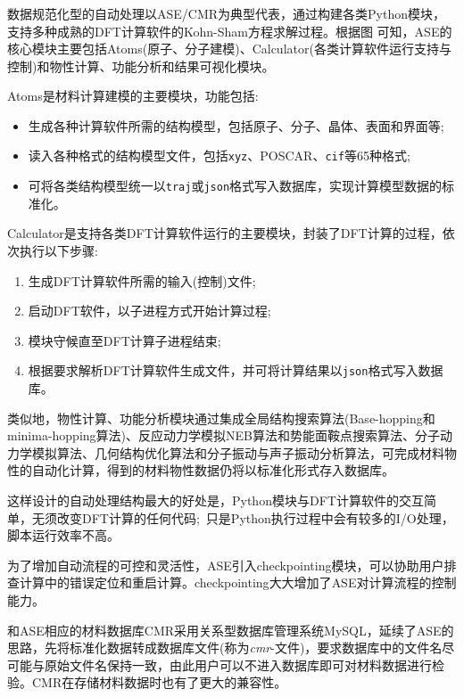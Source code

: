 \frame
{
	\frametitle{}
数据规范化型的自动处理以\textrm{ASE/CMR}为典型代表，通过构建各类\textrm{Python}模块，支持多种成熟的\textrm{DFT}计算软件的\textrm{Kohn-Sham}方程求解过程。根据图%
可知，\textrm{ASE}的核心模块主要包括\textrm{Atoms}(原子、分子建模)、\textrm{Calculator}(各类计算软件运行支持与控制)和物性计算、功能分析和结果可视化模块。

\textrm{Atoms}是材料计算建模的主要模块，功能包括:
\begin{itemize}
	\item 生成各种计算软件所需的结构模型，包括原子、分子、晶体、表面和界面等;
	\item 读入各种格式的结构模型文件，包括\texttt{xyz}、\textrm{POSCAR}、\texttt{cif}等65种格式;
	\item 可将各类结构模型统一以\texttt{traj}或\texttt{json}格式写入数据库，实现计算模型数据的标准化。
\end{itemize}

\textrm{Calculator}是支持各类\textrm{DFT}计算软件运行的主要模块，封装了\textrm{DFT}计算的过程，依次执行以下步骤:
\begin{enumerate}
	\item 生成\textrm{DFT}计算软件所需的输入(控制)文件;
	\item 启动\textrm{DFT}软件，以子进程方式开始计算过程;
	\item 模块守候直至\textrm{DFT}计算子进程结束;
	\item 根据要求解析\textrm{DFT}计算软件生成文件，并可将计算结果以\texttt{json}格式写入数据库。
\end{enumerate}
类似地，物性计算、功能分析模块通过集成全局结构搜索算法(\textrm{Base-hopping}和\textrm{minima-hopping}算法)、反应动力学模拟\textrm{NEB}算法和势能面鞍点搜索算法、分子动力学模拟算法、几何结构优化算法和分子振动与声子振动分析算法，可完成材料物性的自动化计算，得到的材料物性数据仍将以标准化形式存入数据库。

这样设计的自动处理结构最大的好处是，\textrm{Python}模块与\textrm{DFT}计算软件的交互简单，无须改变\textrm{DFT}计算的任何代码;~只是\textrm{Python}执行过程中会有较多的\textrm{I/O}处理，脚本运行效率不高。

为了增加自动流程的可控和灵活性，\textrm{ASE}引入\textrm{checkpointing}模块，可以协助用户排查计算中的错误定位和重启计算。\textrm{checkpointing}大大增加了\textrm{ASE}对计算流程的控制能力。

和\textrm{ASE}相应的材料数据库\textrm{CMR}采用关系型数据库管理系统\textrm{MySQL}，延续了\textrm{ASE}的思路，先将标准化数据转成数据库文件(称为\textit{cmr}-文件)，要求数据库中的文件名尽可能与原始文件名保持一致，由此用户可以不进入数据库即可对材料数据进行检验。\textrm{CMR}在存储材料数据时也有了更大的兼容性。

}
